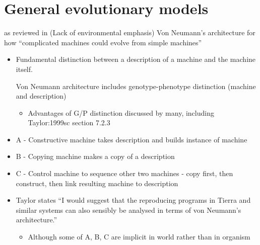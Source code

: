 \section{General evolutionary models}

\autocite{VonNeumann1966} as reviewed in \autocite{Taylor:1999sc} (Lack of environmental emphasis)
Von Neumann's architecture for how ``complicated machines could evolve
from simple machines''

\begin{itemize}
	\item
	
	Fundamental distinction between a description of a machine and the
	machine itself.
	
		      	      Von Neumann architecture includes genotype-phenotype distinction
		      	      (machine and description)
		      	      
		      	      
		      	      \begin{itemize}
		      	      	\item
		      	      	
		      	      	Advantages of G/P distinction discussed by many, including
		      	      	Taylor:1999sc section 7.2.3
		      	      	
		      	      \end{itemize}
		      	      
	\item
	A - Constructive machine takes description and builds instance of machine
	\item	
	B - Copying machine makes a copy of a description
	
	\item
	
	C - Control machine to sequence other two machines - copy first,
	then construct, then link resulting machine to description
	
	\item
	
	Taylor states ``I would suggest that the reproducing programs in
	Tierra and similar systems can also sensibly be analysed in terms of
	von Neumann's architecture.''
	
	
	\begin{itemize}
		\item
		
		Although some of A, B, C are implicit in world rather than in
		organism
		
	\end{itemize}
\end{itemize}

